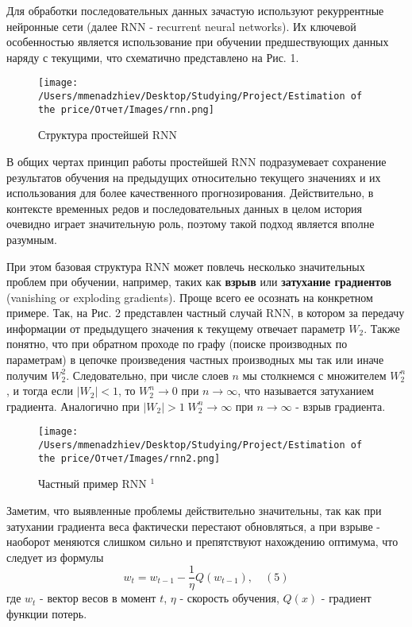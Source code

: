 Для обработки последовательных данных зачастую используют рекуррентные нейронные сети (далее RNN - recurrent neural networks). Их ключевой особенностью является использование при обучении предшествующих данных наряду с текущими, что схематично представлено на Рис. 1.

\begin{figure}[H]
    \centering
    \texttt{[image: /Users/mmenadzhiev/Desktop/Studying/Project/Estimation of the price/Отчет/Images/rnn.png]}
    \caption{Структура простейшей RNN}
\end{figure}

В общих чертах принцип работы простейшей RNN подразумевает сохранение результатов обучения на предыдущих относительно текущего значениях и их использования для более качественного прогнозирования. Действительно, в контексте временных редов и последовательных данных в целом история очевидно играет значительную роль, поэтому такой подход является вполне разумным.

При этом базовая структура RNN может повлечь несколько значительных проблем при обучении, например, таких как \textbf{взрыв} или \textbf{затухание градиентов} (vanishing or exploding gradients). Проще всего ее осознать на конкретном примере. Так, на Рис. 2 представлен частный случай RNN, в котором за передачу информации от предыдущего значения к текущему отвечает параметр $W_2$. Также понятно, что при обратном проходе по графу (поиске производных по параметрам) в цепочке произведения частных производных мы так или иначе получим $W_2^2$. Следовательно, при числе слоев $n$ мы столкнемся с множителем $W_2^n$, и тогда если $|W_2| < 1$, то $W_2^n \to 0$ при $n \to \infty$, что называется затуханием градиента. Аналогично при $|W_2| > 1 \; W_2^n \to \infty$ при $n \to \infty$ - взрыв градиента.

\begin{figure}[H]
    \centering
    \texttt{[image: /Users/mmenadzhiev/Desktop/Studying/Project/Estimation of the price/Отчет/Images/rnn2.png]}
    \caption{Частный пример RNN $\text{}^1$}
\end{figure}

Заметим, что выявленные проблемы действительно значительны, так как при затухании градиента веса фактически перестают обновляться, а при взрыве - наоборот меняются слишком сильно и препятствуют нахождению оптимума, что следует из формулы
\[
w_t = w_{t - 1} - \frac 1 \eta Q(w_{t - 1}), \quad (5)
\]
где $w_t$ - вектор весов в момент $t$, $\eta$ - скорость обучения, $Q(x)$ - градиент функции потерь.

